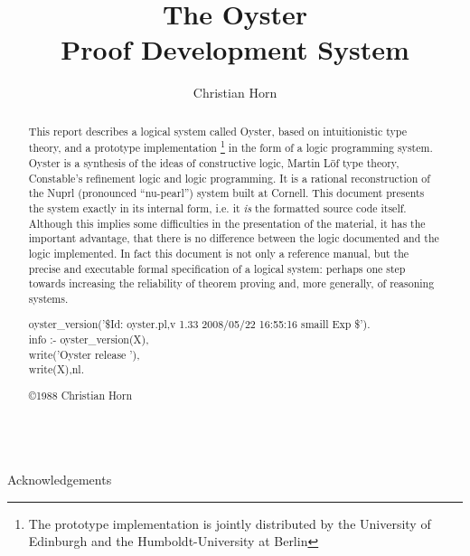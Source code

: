 \documentclass[11pt]{report}
\title{{\huge The Oyster\\ Proof Development System}}
\author{Christian Horn}
\makeatletter
\newcommand{\ulinv}[1]{\index{#1@\texttt{#1}}}
\makeatother
\begin{document}
 \maketitle
 \begin{abstract}
 This report describes a logical system called Oyster, based on
 intuitionistic type theory, and a prototype implementation
 \footnote{The prototype implementation is jointly distributed by
 the University of Edinburgh and the Humboldt-University at Berlin} 
 in the form of a logic programming system. Oyster is a synthesis of
 the ideas of constructive logic, {\sc Martin L\"{o}f} type theory,
 {\sc Constable's} refinement logic and logic programming. It is
 a rational reconstruction of the Nuprl (pronounced ``nu-pearl'')
 system built at Cornell.
 This document presents the system exactly in its internal form,
 i.e. it \emph{is} the formatted source code itself. Although
 this implies some difficulties in the presentation of the
 material, it has the important advantage, that there is no difference
 between the logic documented and the logic implemented.
 In fact this document is not only a reference manual, but the
 precise and executable formal specification of a logical system:
 perhaps one step towards increasing the reliability of theorem
 proving and, more generally, of reasoning systems.
 \ulinv{info}
\begin{sf}\begin{tabbing}
\hspace{4em}oyster\_\hspace{0.1em}version('\$Id: oyster.pl,v 1.33 2008/05/22 16:55:16 smaill Exp \$').\\[-0.15ex]
\hspace{4em}info :- oyster\_\hspace{0.1em}version(X),\\[-0.15ex]
\hspace{8em}write('Oyster release '),\\[-0.15ex]
\hspace{8em}write(X),nl.\\[-0.7ex]

\end{tabbing}\end{sf}

 \vfill
 \begin{center} \copyright 1988 Christian Horn \end{center}
 \end{abstract}
  
  
 \begin{tabbing}\\[5ex]{\Large Acknowledgements}\\\end{tabbing}
  
\end{document}
